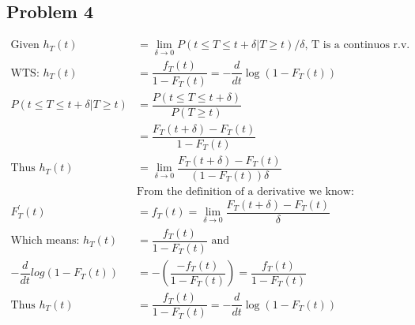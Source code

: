 \documentclass{article}
\begin{document}
\begin{flushleft}
\section*{Problem 4}
\begin{align*}
\text{Given } h_T(t)&=\lim \limits_{\delta \to 0} P(t\leq T\leq t+\delta|T\geq t)/\delta \text{, T is a continuos r.v.}\\
\text{WTS: } h_T(t)&=\dfrac{f_T(t)}{1-F_T(t)}=-\dfrac{d}{dt}\log(1-F_T(t))\\
P(t\leq T\leq t+\delta|T\geq t)&=\dfrac{P(t\leq T\leq t+\delta)}{P(T\geq t)}\\
&=\dfrac{F_T(t+\delta)-F_T(t)}{1-F_T(t)}\\
\text{Thus } h_T(t)&=\lim \limits_{\delta \to 0} \dfrac{F_T(t+\delta)-F_T(t)}{(1-F_T(t))\delta}\\
&\text{From the definition of a derivative we know:}\\
F^{'}_T(t)&=f_T(t)=\lim \limits_{\delta \to 0} \dfrac{F_T(t+\delta)-F_T(t)}{\delta}\\
\text{Which means: }h_T(t)&=\dfrac{f_T(t)}{1-F_T(t)} \text{ and }\\
-\dfrac{d}{dt}log(1-F_T(t))&=-\left(\dfrac{-f_T(t)}{1-F_T(t)}\right)=\dfrac{f_T(t)}{1-F_T(t)}\\
\text{Thus } h_T(t)&=\dfrac{f_T(t)}{1-F_T(t)}=-\dfrac{d}{dt}\log(1-F_T(t))
\end{align*}

\end{flushleft}
\end{document}

